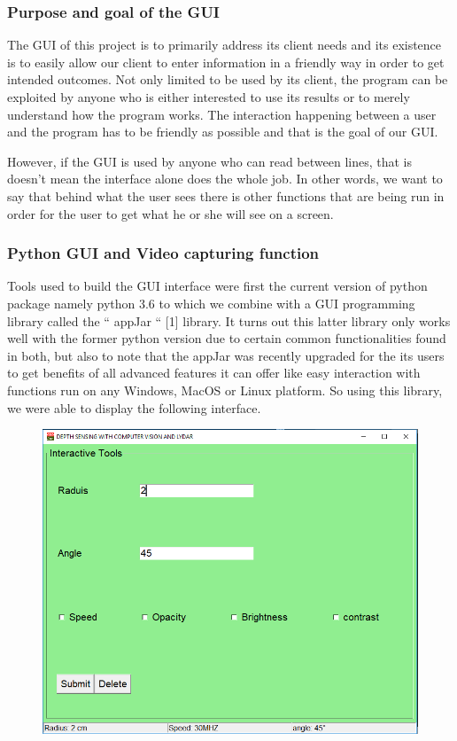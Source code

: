\documentclass[onecolumn, draftclsnofoot,10pt, compsoc]{IEEEtran}
\begin{document}
\begin{singlespace}
		\subsubsection{Purpose and goal of the GUI}	
			The GUI of this project is to primarily address its client needs and its existence is  to easily allow our client to enter information in a friendly way in order to get intended outcomes. Not only limited to be used by its client, the program can be exploited by anyone who is  either interested to use its results or to merely understand how the program works. The  interaction happening between a user and the program has to be friendly as possible and that is the goal of our GUI.

	However, if the GUI is used by anyone who can read between lines, that is doesn’t mean the interface alone does the whole job. In other words, we want to say that behind what the user sees there is other functions that are being run in order for the user to get what he or she will see on a screen.
	
		\subsubsection{ Python GUI and  Video capturing function}
			Tools used to build the GUI interface were first the current version of python package namely python 3.6 to which we combine with a GUI programming library  called the “ appJar “ [1] library. It  turns out this latter library only works well with the former python version due to certain common functionalities found in both, but also to note that the appJar was recently upgraded for the its users to get benefits of all advanced features it can offer like easy interaction with functions run on any  Windows, MacOS or Linux platform.  
So using this library, we were able to  display the following interface.

			\begin{figure}[here]
				\includegraphics[scale=0.4, width=\textwidth]{userinterface.PNG}
				\label{gui}
			\end{figure}
			

\end{singlespace}
\end{document}
